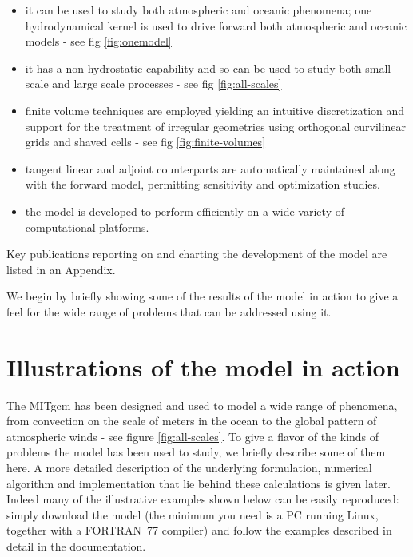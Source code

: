 \begin{itemize}
\item it can be used to study both atmospheric and oceanic phenomena; one
hydrodynamical kernel is used to drive forward both atmospheric and oceanic
models - see fig \ref{fig:onemodel}



\item it has a non-hydrostatic capability and so can be used to study both
small-scale and large scale processes - see fig \ref{fig:all-scales}



\item finite volume techniques are employed yielding an intuitive
discretization and support for the treatment of irregular geometries using
orthogonal curvilinear grids and shaved cells - see fig \ref{fig:finite-volumes}



\item tangent linear and adjoint counterparts are automatically maintained
along with the forward model, permitting sensitivity and optimization
studies.

\item the model is developed to perform efficiently on a wide variety of
computational platforms.
\end{itemize}

Key publications reporting on and charting the development of the model are
listed in an Appendix.

We begin by briefly showing some of the results of the model in action to
give a feel for the wide range of problems that can be addressed using it.


\section{Illustrations of the model in action}

The MITgcm has been designed and used to model a wide range of phenomena,
from convection on the scale of meters in the ocean to the global pattern of
atmospheric winds - see figure \ref{fig:all-scales}. To give a flavor of the
kinds of problems the model has been used to study, we briefly describe some
of them here. A more detailed description of the underlying formulation,
numerical algorithm and implementation that lie behind these calculations is
given later. Indeed many of the illustrative examples shown below can be
easily reproduced: simply download the model (the minimum you need is a PC
running Linux, together with a FORTRAN\ 77 compiler) and follow the examples
described in detail in the documentation.

